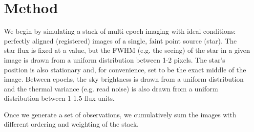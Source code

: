 \documentclass[12pt,preprint]{aastex}
\begin{document}
\section{Method}
We begin by simulating a stack of multi-epoch imaging with ideal conditions: perfectly aligned (registered) images of a single, faint point source (star). The star flux is fixed at a value, but the FWHM (e.g. the seeing) of the star in a given image is drawn from a uniform distribution between 1-2 pixels. The star's position is also stationary and, for convenience, set to be the exact middle of the image. Between epochs, the sky brightness is drawn from a uniform distribution and the thermal variance (e.g. read noise) is also drawn from a uniform distribution between 1-1.5 flux units. %

Once we generate a set of observations, we cumulatively sum the images with different ordering and weighting of the stack. 
\end{document}
